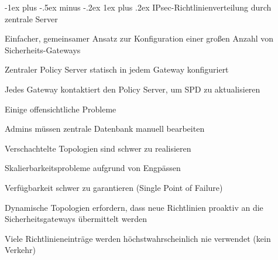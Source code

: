 \documentclass[a4paper]{article}
\makeatletter
\renewcommand{\subsubsection}{\@startsection{subsubsection}{3}{0mm}%
 {-1ex plus -.5ex minus -.2ex}%
 {1ex plus .2ex}%
 {\normalfont\small\bfseries}}
\makeatother
\begin{document}
\begin{multicols}{3}
      \subsubsection{IPsec-Richtlinienverteilung durch zentrale Server}
      \begin{itemize*}
            \item Einfacher, gemeinsamer Ansatz zur Konfiguration einer großen Anzahl von Sicherheits-Gateways
            \item Zentraler Policy Server statisch in jedem Gateway konfiguriert
            \item Jedes Gateway kontaktiert den Policy Server, um SPD zu aktualisieren
            \item Einige offensichtliche Probleme
            \begin{itemize*}
                  \item Admins müssen zentrale Datenbank manuell bearbeiten
                  \item Verschachtelte Topologien sind schwer zu realisieren
                  \item Skalierbarkeitsprobleme aufgrund von Engpässen
                  \item Verfügbarkeit schwer zu garantieren (Single Point of Failure)
                  \item Dynamische Topologien erfordern, dass neue Richtlinien proaktiv an die Sicherheitsgateways übermittelt werden %
                  \item Viele Richtlinieneinträge werden höchstwahrscheinlich nie verwendet (kein Verkehr)
            \end{itemize*}
      \end{itemize*}


\end{multicols}
\end{document}
